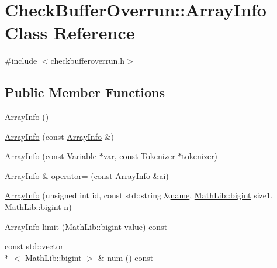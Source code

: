 \hypertarget{class_check_buffer_overrun_1_1_array_info}{\section{Check\-Buffer\-Overrun\-:\-:Array\-Info Class Reference}
\label{class_check_buffer_overrun_1_1_array_info}
}


{\ttfamily \#include $<$checkbufferoverrun.\-h$>$}

\subsection*{Public Member Functions}
\begin{DoxyCompactItemize}
\item 
\hyperlink{group___checks_gac59c163505a075d5a1b42c61663c2ced}{Array\-Info} ()
\item 
\hyperlink{group___checks_ga2107979c03ff20a99aafa4cdd40d52fe}{Array\-Info} (const \hyperlink{class_check_buffer_overrun_1_1_array_info}{Array\-Info} \&)
\item 
\hyperlink{group___checks_ga0251050a5c91e1f827c3515842668164}{Array\-Info} (const \hyperlink{class_variable}{Variable} $\ast$var, const \hyperlink{class_tokenizer}{Tokenizer} $\ast$tokenizer)
\item 
\hyperlink{class_check_buffer_overrun_1_1_array_info}{Array\-Info} \& \hyperlink{group___checks_ga28d6d4fb27e4adcc8f7f364c9073885b}{operator=} (const \hyperlink{class_check_buffer_overrun_1_1_array_info}{Array\-Info} \&ai)
\item 
\hyperlink{group___checks_gadf25b1e6776f6bd756d9282e0fc00dd7}{Array\-Info} (unsigned int id, const std\-::string \&\hyperlink{class_check_ad9b7ad147b5b4cc9b1a7911162432f1c}{name}, \hyperlink{class_math_lib_aea370b3be964c5704b6244d757fcac99}{Math\-Lib\-::bigint} size1, \hyperlink{class_math_lib_aea370b3be964c5704b6244d757fcac99}{Math\-Lib\-::bigint} n)
\item 
\hyperlink{class_check_buffer_overrun_1_1_array_info}{Array\-Info} \hyperlink{group___checks_ga376a9d6b93c92173faeabfa906347a80}{limit} (\hyperlink{class_math_lib_aea370b3be964c5704b6244d757fcac99}{Math\-Lib\-::bigint} value) const 
\item 
const std\-::vector\\*
$<$ \hyperlink{class_math_lib_aea370b3be964c5704b6244d757fcac99}{Math\-Lib\-::bigint} $>$ \& \hyperlink{class_check_buffer_overrun_1_1_array_info_a2507418e9f7612582c1b893f4ac44c2e}{num} () const 

\end{DoxyCompactItemize}
